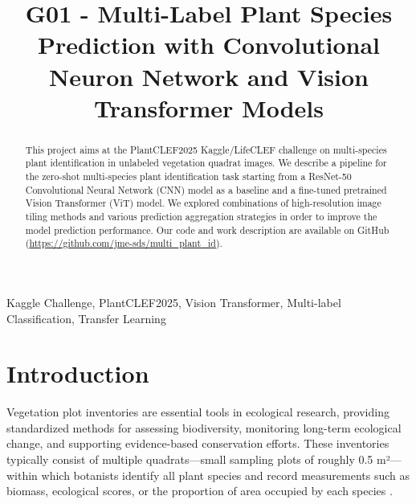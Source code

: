 \documentclass[conference]{IEEEtran}
\begin{document}
\title{G01 - Multi-Label Plant Species Prediction with
Convolutional Neuron Network and Vision Transformer Models\\
}
\author{
\and
{}
\and
{}
}

\maketitle

\begin{abstract}
This project aims at the PlantCLEF2025 Kaggle/LifeCLEF challenge on multi-species plant identification in unlabeled vegetation quadrat images. We describe a pipeline for the zero-shot multi-species plant identification task starting from a ResNet-50 Convolutional Neural Network (CNN) model as a baseline and a fine-tuned pretrained Vision Transformer (ViT) model. We explored combinations of high-resolution image tiling methods and various prediction aggregation strategies in order to improve the model prediction performance. Our code and work description are available on GitHub (\url{https://github.com/jme-sds/multi_plant_id}).
\end{abstract}


\begin{IEEEkeywords}
Kaggle Challenge, PlantCLEF2025, Vision Transformer, Multi-label Classification, Transfer Learning
\end{IEEEkeywords}

\section{Introduction}
    Vegetation plot inventories are essential tools in ecological research, providing standardized methods for assessing biodiversity, monitoring long-term ecological change, and supporting evidence-based conservation efforts. These inventories typically consist of multiple quadrats—small sampling plots of roughly 0.5 m²—within which botanists identify all plant species and record measurements such as biomass, ecological scores, or the proportion of area occupied by each species \cite{goeau2024overviewplantclef2024multispecies}.
    
\end{document}
